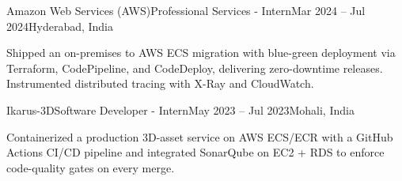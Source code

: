 \resumeExp
{Amazon Web Services (AWS)}{Professional Services - Intern}{Mar 2024 -- Jul 2024}{Hyderabad, India}
\resumeItemListStart
    \item[$\diamond$] Shipped an on-premises to AWS ECS migration with blue-green deployment via Terraform, CodePipeline, and CodeDeploy, delivering zero-downtime releases. Instrumented distributed tracing with X-Ray and CloudWatch.
\resumeItemListEnd

\resumeExp
{Ikarus-3D}{Software Developer - Intern}{May 2023 -- Jul 2023}{Mohali, India}
\resumeItemListStart
    \item[$\diamond$] Containerized a production 3D-asset service on AWS ECS/ECR with a GitHub Actions CI/CD pipeline and integrated SonarQube on EC2 + RDS to enforce code-quality gates on every merge.
\resumeItemListEnd

\resumeSubHeadingListEnd
